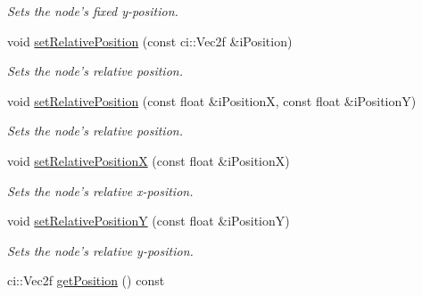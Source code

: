 \begin{DoxyCompactItemize}
\begin{DoxyCompactList}\small\item\em Sets the node's fixed y-\/position. \end{DoxyCompactList}\item 
\hypertarget{class_ui_base_ab1f2a0901c5260172481aa0aa487c0b7}{void \hyperlink{class_ui_base_ab1f2a0901c5260172481aa0aa487c0b7}{set\-Relative\-Position} (const ci\-::\-Vec2f \&i\-Position)}\label{class_ui_base_ab1f2a0901c5260172481aa0aa487c0b7}

\begin{DoxyCompactList}\small\item\em Sets the node's relative position. \end{DoxyCompactList}\item 
\hypertarget{class_ui_base_aae54f086ea3844e78ca75e88481ce5ae}{void \hyperlink{class_ui_base_aae54f086ea3844e78ca75e88481ce5ae}{set\-Relative\-Position} (const float \&i\-Position\-X, const float \&i\-Position\-Y)}\label{class_ui_base_aae54f086ea3844e78ca75e88481ce5ae}

\begin{DoxyCompactList}\small\item\em Sets the node's relative position. \end{DoxyCompactList}\item 
\hypertarget{class_ui_base_ac0bf18ff3dbb20e0d9d3fcf580e82884}{void \hyperlink{class_ui_base_ac0bf18ff3dbb20e0d9d3fcf580e82884}{set\-Relative\-Position\-X} (const float \&i\-Position\-X)}\label{class_ui_base_ac0bf18ff3dbb20e0d9d3fcf580e82884}

\begin{DoxyCompactList}\small\item\em Sets the node's relative x-\/position. \end{DoxyCompactList}\item 
\hypertarget{class_ui_base_a0969f3780af69d6deb1f537f9f7383e8}{void \hyperlink{class_ui_base_a0969f3780af69d6deb1f537f9f7383e8}{set\-Relative\-Position\-Y} (const float \&i\-Position\-Y)}\label{class_ui_base_a0969f3780af69d6deb1f537f9f7383e8}

\begin{DoxyCompactList}\small\item\em Sets the node's relative y-\/position. \end{DoxyCompactList}\item 
\hypertarget{class_ui_base_a6e3803f7b6f6940c9137407da541087f}{ci\-::\-Vec2f \hyperlink{class_ui_base_a6e3803f7b6f6940c9137407da541087f}{get\-Position} () const }\label{class_ui_base_a6e3803f7b6f6940c9137407da541087f}


\end{DoxyCompactItemize}
